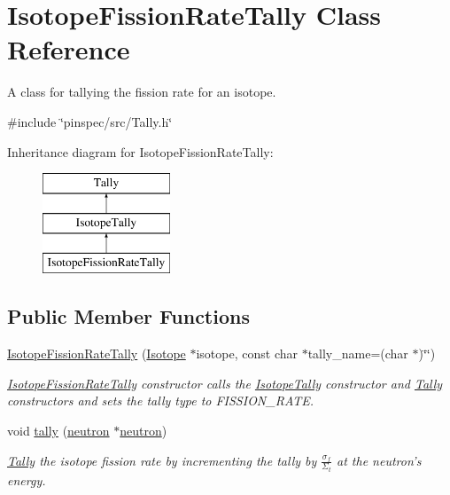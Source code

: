 \hypertarget{classIsotopeFissionRateTally}{\section{Isotope\-Fission\-Rate\-Tally Class Reference}
\label{classIsotopeFissionRateTally}
}


A class for tallying the fission rate for an isotope.  




{\ttfamily \#include \char`\"{}pinspec/src/\-Tally.\-h\char`\"{}}

Inheritance diagram for Isotope\-Fission\-Rate\-Tally\-:\begin{figure}[H]
\begin{center}
\leavevmode
\includegraphics[height=3.000000cm]{classIsotopeFissionRateTally}
\end{center}
\end{figure}
\subsection*{Public Member Functions}
\begin{DoxyCompactItemize}
\item 
\hyperlink{classIsotopeFissionRateTally_a3fc1712cbad1343b8580560e152442c1}{Isotope\-Fission\-Rate\-Tally} (\hyperlink{classIsotope}{Isotope} $\ast$isotope, const char $\ast$tally\-\_\-name=(char $\ast$)\char`\"{}\char`\"{})
\begin{DoxyCompactList}\small\item\em \hyperlink{classIsotopeFissionRateTally}{Isotope\-Fission\-Rate\-Tally} constructor calls the \hyperlink{classIsotopeTally}{Isotope\-Tally} constructor and \hyperlink{classTally}{Tally} constructors and sets the tally type to F\-I\-S\-S\-I\-O\-N\-\_\-\-R\-A\-T\-E. \end{DoxyCompactList}\item 
void \hyperlink{classIsotopeFissionRateTally_aeeed9917e1134a1a37ed58a5f94dd569}{tally} (\hyperlink{structneutron}{neutron} $\ast$\hyperlink{structneutron}{neutron})
\begin{DoxyCompactList}\small\item\em \hyperlink{classTally}{Tally} the isotope fission rate by incrementing the tally by $ \frac{\sigma_f}{\Sigma_t} $ at the neutron's energy. \end{DoxyCompactList}\end{DoxyCompactItemize}
